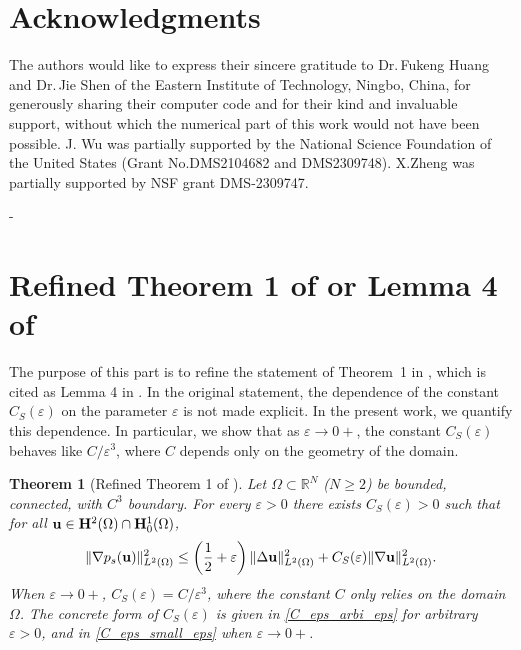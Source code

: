 \documentclass{article}
\newtheorem{theorem}{Theorem}[section]      %
\theoremstyle{definition}                   %
\begin{document}
\section*{Acknowledgments}
The authors would like to express their sincere gratitude to Dr.\,Fukeng Huang and Dr.\,Jie Shen of the Eastern Institute of Technology, Ningbo, China, for generously sharing their computer code and for their kind and invaluable support, without which the numerical part of this work would not have been possible.
J. Wu was partially supported by the National Science Foundation of the United States
(Grant No.DMS2104682 and DMS2309748). X.Zheng was partially supported by NSF grant DMS-2309747.




\appendix
-\section{Refined Theorem 1 of \cite{LiuLiuPego2007} or Lemma 4 of \cite{HuangShen2023}}
The purpose of this part is to refine the statement of Theorem~1 in \cite{LiuLiuPego2007}, which is cited as Lemma 4 in \cite{HuangShen2023}. In the original statement, the dependence of the
constant $C_S(\varepsilon)$ on the parameter $\varepsilon$ is not made explicit.
In the present work, we quantify this dependence. In particular, we show that
as $\varepsilon \to 0+$, the constant $C_S(\varepsilon)$ behaves like
$C/\varepsilon^3$, where $C$ depends only on the geometry of the domain.


\begin{theorem}[Refined Theorem 1 of \cite{LiuLiuPego2007}]
\label{refinedTheorem1LiuLiuPego}
Let $\Omega\subset\mathbb{R}^N$ ($N\ge 2$) be bounded, connected, with $C^3$ boundary.
For every $\varepsilon>0$ there exists $C_S(\varepsilon)>0$ such that for all
${\bf u}\in {\bf H}^2(\Omega)\cap {\bf H}^1_0(\Omega)$,
\begin{equation}\label{eq:thm}
\|\nabla p_s({\bf u})\|_{L^2(\Omega)}^2
\le \left(\frac12+\varepsilon\right)\|\Delta{\bf u}\|_{L^2(\Omega)}^2
+ C_S(\varepsilon)\|\nabla{\bf u}\|_{L^2(\Omega)}^2.
\end{equation}
When $\varepsilon\to 0+$, $C_S(\varepsilon)=C/\varepsilon^3$,  where the constant $C$ only relies on the domain $\Omega$. The concrete form of $C_S(\varepsilon)$ is given in \eqref{C_eps_arbi_eps} for arbitrary $\varepsilon>0$, and in \eqref{C_eps_small_eps} when $\varepsilon\to 0+$.
\end{theorem}
\end{document}
